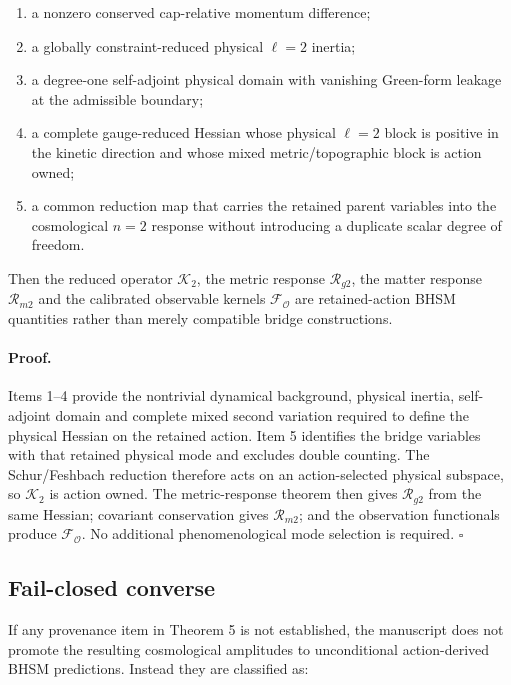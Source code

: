 \begin{enumerate}
\item a nonzero conserved cap-relative momentum difference;
\item a globally constraint-reduced physical $\ell=2$ inertia;
\item a degree-one self-adjoint physical domain with vanishing Green-form
      leakage at the admissible boundary;
\item a complete gauge-reduced Hessian whose physical $\ell=2$ block is
      positive in the kinetic direction and whose mixed metric/topographic
      block is action owned;
\item a common reduction map that carries the retained parent variables into
      the cosmological $n=2$ response without introducing a duplicate scalar
      degree of freedom.
\end{enumerate}

Then the reduced operator $\mathcal K_2$, the metric response
$\mathcal R_{g2}$, the matter response $\mathcal R_{m2}$ and the calibrated
observable kernels $\mathcal F_{\mathcal O}$ are retained-action BHSM
quantities rather than merely compatible bridge constructions.

\paragraph{Proof.}
Items 1--4 provide the nontrivial dynamical background, physical inertia,
self-adjoint domain and complete mixed second variation required to define the
physical Hessian on the retained action.  Item 5 identifies the bridge
variables with that retained physical mode and excludes double counting.
The Schur/Feshbach reduction therefore acts on an action-selected physical
subspace, so $\mathcal K_2$ is action owned.  The metric-response theorem then
gives $\mathcal R_{g2}$ from the same Hessian; covariant conservation gives
$\mathcal R_{m2}$; and the observation functionals produce
$\mathcal F_{\mathcal O}$.  No additional phenomenological mode selection is
required. \hfill$\square$

\subsection{Fail-closed converse}

If any provenance item in Theorem 5 is not established, the manuscript does
not promote the resulting cosmological amplitudes to unconditional
action-derived BHSM predictions.  Instead they are classified as:

